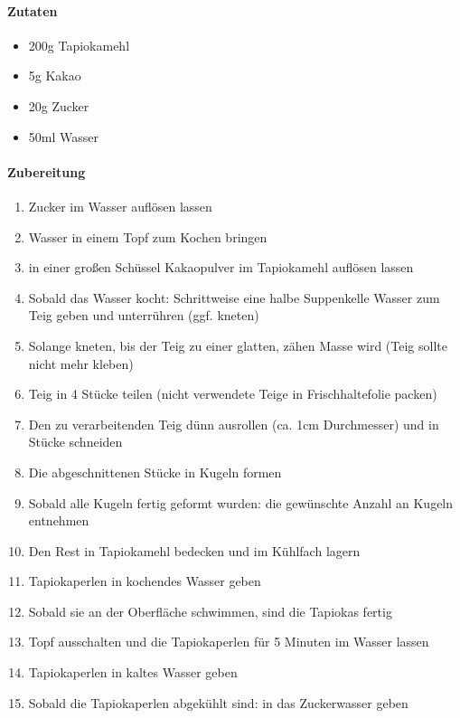 \newpage
{}
\paragraph{Zutaten}
\begin{itemize}[noitemsep]
	\item 200g Tapiokamehl
	\item 5g Kakao
	\item 20g Zucker 
	\item 50ml Wasser
\end{itemize}


\paragraph{Zubereitung}
\begin{enumerate}[noitemsep]
	\item Zucker im Wasser auflösen lassen
	\item Wasser in einem Topf zum Kochen bringen
	\item in einer großen Schüssel Kakaopulver im Tapiokamehl auflösen lassen
	\item Sobald das Wasser kocht: Schrittweise eine halbe Suppenkelle Wasser zum Teig geben und unterrühren (ggf. kneten)
	\item Solange kneten, bis der Teig zu einer glatten, zähen Masse wird (Teig sollte nicht mehr kleben)
	\item Teig in 4 Stücke teilen (nicht verwendete Teige in Frischhaltefolie packen)
	\item Den zu verarbeitenden Teig dünn ausrollen (ca. 1cm Durchmesser) und in Stücke schneiden
	\item Die abgeschnittenen Stücke in Kugeln formen
	\item Sobald alle Kugeln fertig geformt wurden: die gewünschte Anzahl an Kugeln entnehmen
	\item Den Rest in Tapiokamehl bedecken und im Kühlfach lagern
	\item Tapiokaperlen in kochendes Wasser geben
	\item Sobald sie an der Oberfläche schwimmen, sind die Tapiokas fertig 
	\item Topf ausschalten und die Tapiokaperlen für 5 Minuten im Wasser lassen
	\item Tapiokaperlen in kaltes Wasser geben
	\item Sobald die Tapiokaperlen abgekühlt sind: in das Zuckerwasser geben
\end{enumerate}